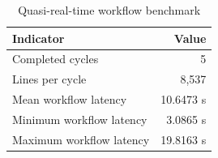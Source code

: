 \begin{table}[t]
\caption{Quasi-real-time workflow benchmark}
\label{tab:realtime_benchmark_full}
\centering
\scriptsize
\begin{tabular}{l r}
\toprule
\textbf{Indicator} & \textbf{Value} \\
\midrule
Completed cycles & 5 \\
Lines per cycle & 8,537 \\
Mean workflow latency & 10.6473 s \\
Minimum workflow latency & 3.0865 s \\
Maximum workflow latency & 19.8163 s \\
\bottomrule
\end{tabular}
\end{table}
